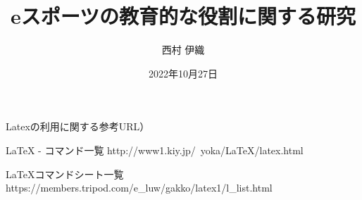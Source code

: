 \documentclass[gaiyou]{hitsotsuron} %
\title{eスポーツの教育的な役割に関する研究}
\author{西村 伊織}
\date{2022年10月27日}
\begin{document}

\twocolumn[%
\maketitle
]


Latexの利用に関する参考URL）

LaTeX - コマンド一覧
http://www1.kiy.jp/~yoka/LaTeX/latex.html

LaTeXコマンドシート一覧
https://members.tripod.com/e_luw/gakko/latex1/l_list.html

\fi







%



\end{document}
